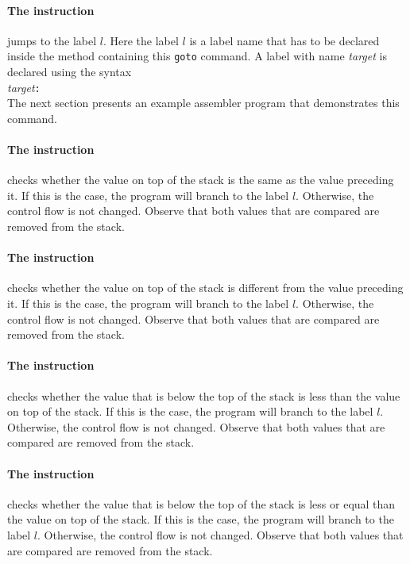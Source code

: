 \paragraph{The instruction }
jumps to the label $l$.  Here the label $l$ is a label name that has to be declared inside the
method containing this \texttt{goto} command.  A label with name \textsl{target} is declared using the syntax
\\[0.2cm]
\hspace*{1.3cm}
\textsl{target}\texttt{:}
\\[0.2cm]
The next section presents an example assembler program that demonstrates this command.
 
\paragraph{The instruction }
checks whether the value on top of the stack is the same as the value preceding it.  If this is the case, the program will branch
to the label $l$.  Otherwise, the control flow is not changed.  Observe that both values that are
compared are removed from the stack.

\paragraph{The instruction }
checks whether the value on top of the stack is different from the value preceding it.  If this is the case, the program will branch
to the label $l$.  Otherwise, the control flow is not changed.  Observe that both values that are
compared are removed from the stack.

\paragraph{The instruction }
checks whether the value that is below the top of the stack is less than the value on top of the stack.  If this is the case, the program will branch
to the label $l$.  Otherwise, the control flow is not changed.  Observe that both values that are
compared are removed from the stack.

\paragraph{The instruction }
checks whether the value that is below the top of the stack is less or equal than the value on top
of the stack.  If this is the case, the program will branch 
to the label $l$.  Otherwise, the control flow is not changed.  Observe that both values that are
compared are removed from the stack.


